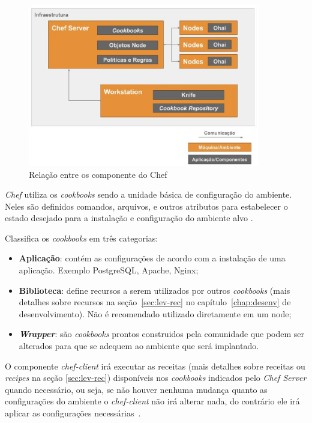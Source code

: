 \begin{figure}[H]
  \centering
  \includegraphics[width=0.9\textwidth]{figuras/chef-comp.eps}
  \caption{Relação entre os componente do Chef}
  \label{fig:chef-comp}
\end{figure}

\textit{Chef} utiliza os \textit{cookbooks} sendo a unidade básica de configuração do
ambiente. Neles são definidos comandos, arquivos, e outros atributos
para estabelecer o estado desejado para a instalação e configuração
do ambiente alvo \cite{sharma:2015}.

 Classifica os \textit{cookbooks} em três categorias:
\begin{itemize}
  \item \textbf{Aplicação}: contém as configurações de acordo com a instalação de
    uma aplicação. Exemplo PostgreSQL, Apache, Nginx;
  \item \textbf{Biblioteca}: define recursos a serem utilizados por outros \textit{cookbooks}
    (mais detalhes sobre recursos na seção~\ref{sec:lev-rec} no capítulo~\ref{chap:desenv} de desenvolvimento).
    Não é recomendado utilizado diretamente em um node;
  \item \textbf{\textit{Wrapper}}: são \textit{cookbooks} prontos construidos pela comunidade que podem
    ser alterados para que se adequem ao ambiente que será implantado.
\end{itemize}

O componente \textit{chef-client} irá executar as receitas (mais detalhes sobre receitas ou
\textit{recipes} na seção \ref{sec:lev-rec}) disponíveis nos \textit{cookbooks}
indicados pelo \textit{Chef Server} quando necessário, ou seja, se não houver
nenhuma mudança quanto as configurações do ambiente o \textit{chef-client} não irá
alterar nada, do contrário ele irá aplicar as configurações necessárias~\cite{chefdoc:2016}.




